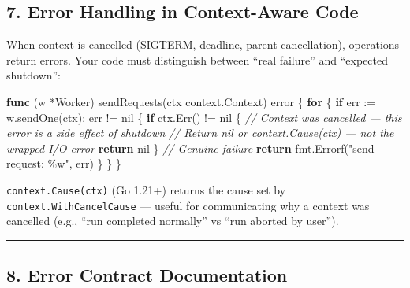 \documentclass[
]{article}
\newenvironment{Shaded}{}{}
\newcommand{\CommentTok}[1]{\textcolor[rgb]{0.38,0.63,0.69}{\textit{#1}}}
\newcommand{\ControlFlowTok}[1]{\textcolor[rgb]{0.00,0.44,0.13}{\textbf{#1}}}
\newcommand{\DataTypeTok}[1]{\textcolor[rgb]{0.56,0.13,0.00}{#1}}
\newcommand{\KeywordTok}[1]{\textcolor[rgb]{0.00,0.44,0.13}{\textbf{#1}}}
\newcommand{\NormalTok}[1]{#1}
\newcommand{\OperatorTok}[1]{\textcolor[rgb]{0.40,0.40,0.40}{#1}}
\newcommand{\OtherTok}[1]{\textcolor[rgb]{0.00,0.44,0.13}{#1}}
\newcommand{\StringTok}[1]{\textcolor[rgb]{0.25,0.44,0.63}{#1}}
\begin{document}
\hypertarget{error-handling-in-context-aware-code}{%
\subsection{7. Error Handling in Context-Aware
Code}\label{error-handling-in-context-aware-code}}

When context is cancelled (SIGTERM, deadline, parent cancellation),
operations return errors. Your code must distinguish between ``real
failure'' and ``expected shutdown'':

\begin{Shaded}
\begin{Highlighting}[]
\KeywordTok{func} \OperatorTok{(}\NormalTok{w }\OperatorTok{*}\NormalTok{Worker}\OperatorTok{)}\NormalTok{ sendRequests}\OperatorTok{(}\NormalTok{ctx context}\OperatorTok{.}\NormalTok{Context}\OperatorTok{)} \DataTypeTok{error} \OperatorTok{\{}
    \ControlFlowTok{for} \OperatorTok{\{}
        \ControlFlowTok{if}\NormalTok{ err }\OperatorTok{:=}\NormalTok{ w}\OperatorTok{.}\NormalTok{sendOne}\OperatorTok{(}\NormalTok{ctx}\OperatorTok{);}\NormalTok{ err }\OperatorTok{!=} \OtherTok{nil} \OperatorTok{\{}
            \ControlFlowTok{if}\NormalTok{ ctx}\OperatorTok{.}\NormalTok{Err}\OperatorTok{()} \OperatorTok{!=} \OtherTok{nil} \OperatorTok{\{}
                \CommentTok{// Context was cancelled — this error is a side effect of shutdown}
                \CommentTok{// Return nil or context.Cause(ctx) — not the wrapped I/O error}
                \ControlFlowTok{return} \OtherTok{nil}
            \OperatorTok{\}}
            \CommentTok{// Genuine failure}
            \ControlFlowTok{return}\NormalTok{ fmt}\OperatorTok{.}\NormalTok{Errorf}\OperatorTok{(}\StringTok{"send request: \%w"}\OperatorTok{,}\NormalTok{ err}\OperatorTok{)}
        \OperatorTok{\}}
    \OperatorTok{\}}
\OperatorTok{\}}
\end{Highlighting}
\end{Shaded}

\texttt{context.Cause(ctx)} (Go 1.21+) returns the cause set by
\texttt{context.WithCancelCause} --- useful for communicating why a
context was cancelled (e.g., ``run completed normally'' vs ``run aborted
by user'').

\begin{center}\rule{0.5\linewidth}{0.5pt}\end{center}

\hypertarget{error-contract-documentation}{%
\subsection{8. Error Contract
Documentation}\label{error-contract-documentation}}
\end{document}
